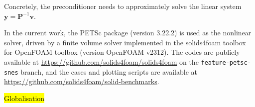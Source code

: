 \documentclass[sn-mathphys,Numbered]{sn-jnl}%
\newcommand{\bb}{\boldsymbol}
\begin{document}
Concretely, the preconditioner needs to approximately solve the linear system $\bb{y} = \bb{P}^{-1} \bb{v}$.


In the current work, the PETSc package (version 3.22.2) \cite{PETSc} is used as the nonlinear solver, driven by a finite volume solver implemented in the solids4foam toolbox \citep{Cardiff2018, Tukovic2018} for OpenFOAM toolbox \citep{Weller1998} (version OpenFOAM-v2312).
The codes are publicly available at \url{https://github.com/solids4foam/solids4foam} on the \texttt{feature-petsc-snes} branch, and the cases and plotting scripts are available at \url{https://github.com/solids4foam/solid-benchmarks}.



\hl{Globalisation}
\end{document}

